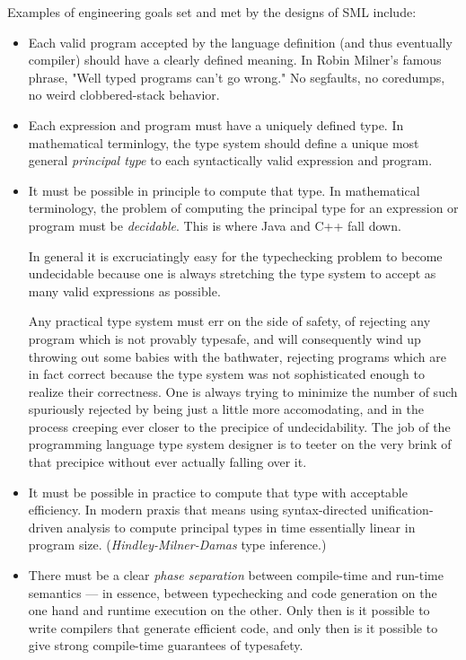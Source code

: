 Examples of engineering goals set and met by the designs of SML include: 
\begin{itemize}
\item Each valid program accepted by the language definition (and thus 
      eventually compiler) should have a clearly defined meaning.  In 
      Robin Milner's famous phrase, "Well typed programs can't go wrong." 
      No segfaults, no coredumps, no weird clobbered-stack behavior. 

\item Each expression and program must have a uniquely defined type. 
      In mathematical terminlogy, the type system should define a unique 
      most general {\it principal type} to each syntactically valid 
      expression and program.  

\item It must be possible in principle to compute that type.  In mathematical 
      terminology, the problem of computing the principal type for an expression 
      or program must be {\it decidable}.  This is where Java and C++ fall down. 

      In general it is excruciatingly easy for the typechecking problem to become 
      undecidable because one is always stretching the type system to accept as 
      many valid expressions as possible. 

      Any practical type system must err on 
      the side of safety, of rejecting any program which is not provably typesafe, 
      and will consequently wind up throwing out some babies with the bathwater, 
      rejecting programs which are in fact correct because the type system was 
      not sophisticated enough to realize their correctness.  One is always trying 
      to minimize the number of such spuriously rejected by being just a little 
      more accomodating, and in the process creeping ever closer to the precipice 
      of undecidability.  The job of the programming language type system designer 
      is to teeter on the very brink of that precipice without ever actually falling 
      over it. 

\item It must be possible in practice to compute that type with acceptable efficiency. 
      In modern praxis that means using syntax-directed unification-driven analysis 
      to compute principal types in time essentially linear in program size. 
      ({\it Hindley-Milner-Damas} type inference.) 

\item There must be a clear {\it phase separation} between compile-time and run-time 
      semantics --- in essence, between typechecking and code generation on the one 
      hand and runtime execution on the other.  Only then is it possible to write 
      compilers that generate efficient code, and only then is it possible to give 
      strong compile-time guarantees of typesafety. 


\end{itemize}
